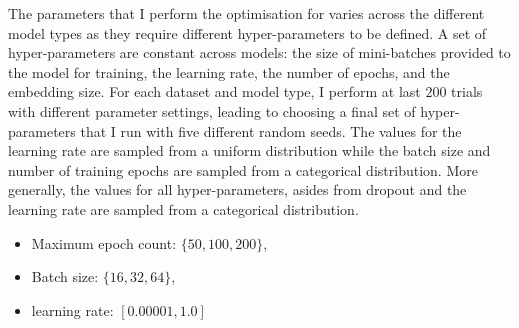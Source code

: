 The parameters that I perform the optimisation for varies across the different model types as they require different hyper-parameters to be defined. A set of hyper-parameters are constant across models: the size of mini-batches provided to the model for training, the learning rate, the number of epochs, and the embedding size. For each dataset and model type, I perform at last $200$ trials with different parameter settings, leading to choosing a final set of hyper-parameters that I run with five different random seeds.
The values for the learning rate are sampled from a uniform distribution while the batch size and number of training epochs are sampled from a categorical distribution. More generally, the values for all hyper-parameters, asides from dropout and the learning rate are sampled from a categorical distribution.

\begin{itemize}
  \item Maximum epoch count: $\{50, 100, 200\}$,
  \item Batch size: $\{16, 32, 64\}$,
  \item learning rate: $[0.00001, 1.0]$
\end{itemize}


